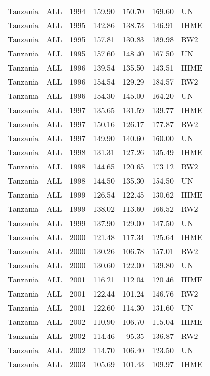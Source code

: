 \begin{longtable}{lllrrrl}
  Tanzania & ALL & 1994 & 159.90 & 150.70 & 169.60 & UN \\ 
  Tanzania & ALL & 1995 & 142.86 & 138.73 & 146.91 & IHME \\ 
  Tanzania & ALL & 1995 & 157.81 & 130.83 & 189.98 & RW2 \\ 
  Tanzania & ALL & 1995 & 157.60 & 148.40 & 167.50 & UN \\ 
  Tanzania & ALL & 1996 & 139.54 & 135.50 & 143.51 & IHME \\ 
  Tanzania & ALL & 1996 & 154.54 & 129.29 & 184.57 & RW2 \\ 
  Tanzania & ALL & 1996 & 154.30 & 145.00 & 164.20 & UN \\ 
  Tanzania & ALL & 1997 & 135.65 & 131.59 & 139.77 & IHME \\ 
  Tanzania & ALL & 1997 & 150.16 & 126.17 & 177.87 & RW2 \\ 
  Tanzania & ALL & 1997 & 149.90 & 140.60 & 160.00 & UN \\ 
  Tanzania & ALL & 1998 & 131.31 & 127.26 & 135.49 & IHME \\ 
  Tanzania & ALL & 1998 & 144.65 & 120.65 & 173.12 & RW2 \\ 
  Tanzania & ALL & 1998 & 144.50 & 135.30 & 154.50 & UN \\ 
  Tanzania & ALL & 1999 & 126.54 & 122.45 & 130.62 & IHME \\ 
  Tanzania & ALL & 1999 & 138.02 & 113.60 & 166.52 & RW2 \\ 
  Tanzania & ALL & 1999 & 137.90 & 129.00 & 147.50 & UN \\ 
  Tanzania & ALL & 2000 & 121.48 & 117.34 & 125.64 & IHME \\ 
  Tanzania & ALL & 2000 & 130.26 & 106.78 & 157.01 & RW2 \\ 
  Tanzania & ALL & 2000 & 130.60 & 122.00 & 139.80 & UN \\ 
  Tanzania & ALL & 2001 & 116.21 & 112.04 & 120.46 & IHME \\ 
  Tanzania & ALL & 2001 & 122.44 & 101.24 & 146.76 & RW2 \\ 
  Tanzania & ALL & 2001 & 122.60 & 114.30 & 131.60 & UN \\ 
  Tanzania & ALL & 2002 & 110.90 & 106.70 & 115.04 & IHME \\ 
  Tanzania & ALL & 2002 & 114.46 & 95.35 & 136.87 & RW2 \\ 
  Tanzania & ALL & 2002 & 114.70 & 106.40 & 123.50 & UN \\ 
  Tanzania & ALL & 2003 & 105.69 & 101.43 & 109.97 & IHME \\ 

\end{longtable}
